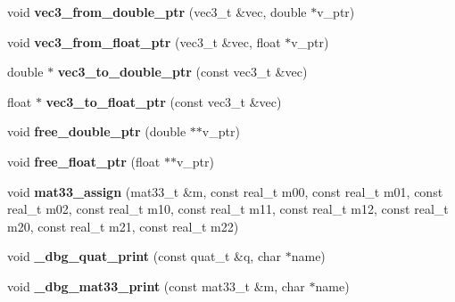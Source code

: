 \begin{DoxyCompactItemize}
\item 
void {\bfseries vec3\+\_\+from\+\_\+double\+\_\+ptr} (vec3\+\_\+t \&vec, double $\ast$v\+\_\+ptr)\hypertarget{namespacekukadu_a2c06418b0a25d8d29e7dd9d2407263fc}{}\label{namespacekukadu_a2c06418b0a25d8d29e7dd9d2407263fc}

\item 
void {\bfseries vec3\+\_\+from\+\_\+float\+\_\+ptr} (vec3\+\_\+t \&vec, float $\ast$v\+\_\+ptr)\hypertarget{namespacekukadu_a9a9f3a3b33364dff707bf7e88a6eb88d}{}\label{namespacekukadu_a9a9f3a3b33364dff707bf7e88a6eb88d}

\item 
double $\ast$ {\bfseries vec3\+\_\+to\+\_\+double\+\_\+ptr} (const vec3\+\_\+t \&vec)\hypertarget{namespacekukadu_afdf61ce6363dc9d844c73fb6d58d0a35}{}\label{namespacekukadu_afdf61ce6363dc9d844c73fb6d58d0a35}

\item 
float $\ast$ {\bfseries vec3\+\_\+to\+\_\+float\+\_\+ptr} (const vec3\+\_\+t \&vec)\hypertarget{namespacekukadu_a60ebd4a010fba93630f1f8b70293acdf}{}\label{namespacekukadu_a60ebd4a010fba93630f1f8b70293acdf}

\item 
void {\bfseries free\+\_\+double\+\_\+ptr} (double $\ast$$\ast$v\+\_\+ptr)\hypertarget{namespacekukadu_a41b45ef5ff1c387bbeca3e5913d9c3c5}{}\label{namespacekukadu_a41b45ef5ff1c387bbeca3e5913d9c3c5}

\item 
void {\bfseries free\+\_\+float\+\_\+ptr} (float $\ast$$\ast$v\+\_\+ptr)\hypertarget{namespacekukadu_a7666977cc8fdea652ad1cfbcbe7a0fc3}{}\label{namespacekukadu_a7666977cc8fdea652ad1cfbcbe7a0fc3}

\item 
void {\bfseries mat33\+\_\+assign} (mat33\+\_\+t \&m, const real\+\_\+t m00, const real\+\_\+t m01, const real\+\_\+t m02, const real\+\_\+t m10, const real\+\_\+t m11, const real\+\_\+t m12, const real\+\_\+t m20, const real\+\_\+t m21, const real\+\_\+t m22)\hypertarget{namespacekukadu_a7dda7b6c163f6fad3ca4b90d43f7c044}{}\label{namespacekukadu_a7dda7b6c163f6fad3ca4b90d43f7c044}

\item 
void {\bfseries \+\_\+dbg\+\_\+quat\+\_\+print} (const quat\+\_\+t \&q, char $\ast$name)\hypertarget{namespacekukadu_a46535aeb99513e504e943131d59f1818}{}\label{namespacekukadu_a46535aeb99513e504e943131d59f1818}

\item 
void {\bfseries \+\_\+dbg\+\_\+mat33\+\_\+print} (const mat33\+\_\+t \&m, char $\ast$name)\hypertarget{namespacekukadu_aebe42440655a00d2745edbc0ce209807}{}\label{namespacekukadu_aebe42440655a00d2745edbc0ce209807}


\end{DoxyCompactItemize}
